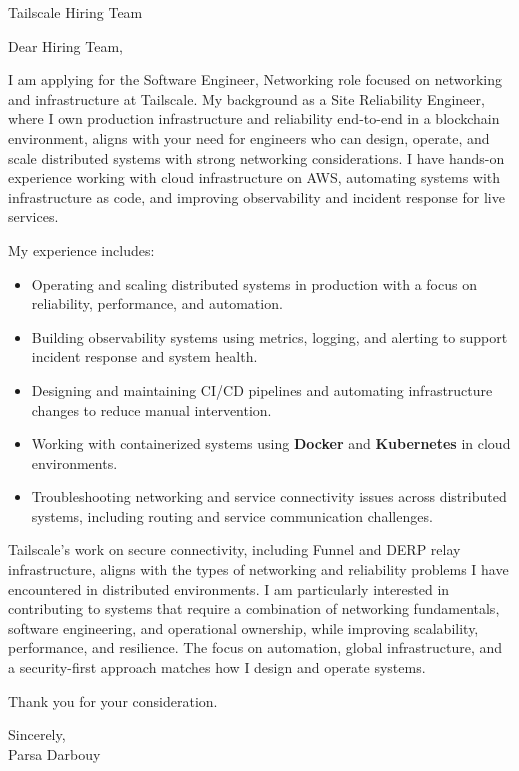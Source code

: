 \documentclass[11pt]{letter}
\date{\today}
\begin{document}
\begin{letter}{Tailscale Hiring Team}

\opening{Dear Hiring Team,}

I am applying for the Software Engineer, Networking role focused on networking and infrastructure at Tailscale. My background as a Site Reliability Engineer, where I own production infrastructure and reliability end-to-end in a blockchain environment, aligns with your need for engineers who can design, operate, and scale distributed systems with strong networking considerations. I have hands-on experience working with cloud infrastructure on AWS, automating systems with infrastructure as code, and improving observability and incident response for live services.

My experience includes:
\begin{itemize}
    \item Operating and scaling distributed systems in production with a focus on reliability, performance, and automation.
    \item Building observability systems using metrics, logging, and alerting to support incident response and system health.
    \item Designing and maintaining CI/CD pipelines and automating infrastructure changes to reduce manual intervention.
    \item Working with containerized systems using \textbf{Docker} and \textbf{Kubernetes} in cloud environments.
    \item Troubleshooting networking and service connectivity issues across distributed systems, including routing and service communication challenges.
\end{itemize}

Tailscale’s work on secure connectivity, including Funnel and DERP relay infrastructure, aligns with the types of networking and reliability problems I have encountered in distributed environments. I am particularly interested in contributing to systems that require a combination of networking fundamentals, software engineering, and operational ownership, while improving scalability, performance, and resilience. The focus on automation, global infrastructure, and a security-first approach matches how I design and operate systems.

Thank you for your consideration.

\noindent
Sincerely, \newline
{\\ Parsa Darbouy}

\end{letter}
\end{document}
